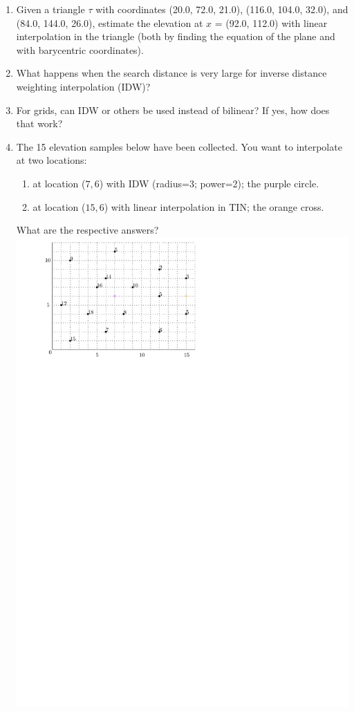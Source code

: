 \begin{enumerate}
  \item Given a triangle $\tau$ with coordinates (20.0, 72.0, 21.0), (116.0, 104.0, 32.0), and (84.0, 144.0, 26.0), estimate the elevation at $x$ = (92.0, 112.0) with linear interpolation in the triangle (both by finding the equation of the plane and with barycentric coordinates).
  \item What happens when the search distance is very large for inverse distance weighting interpolation (IDW)?
  \item For grids, can IDW or others be used instead of bilinear? If yes, how does that work?
  \item The 15 elevation samples below have been collected. You want to interpolate at two locations:
  \begin{enumerate}
    \item at location ($7,6$) with IDW (radius=3; power=2); the purple circle.
    \item at location ($15,6$) with linear interpolation in TIN; the orange cross.
  \end{enumerate} 
  What are the respective answers?
  \\
  \includegraphics[width=0.9\linewidth]{figs/interpol}
\end{enumerate}
